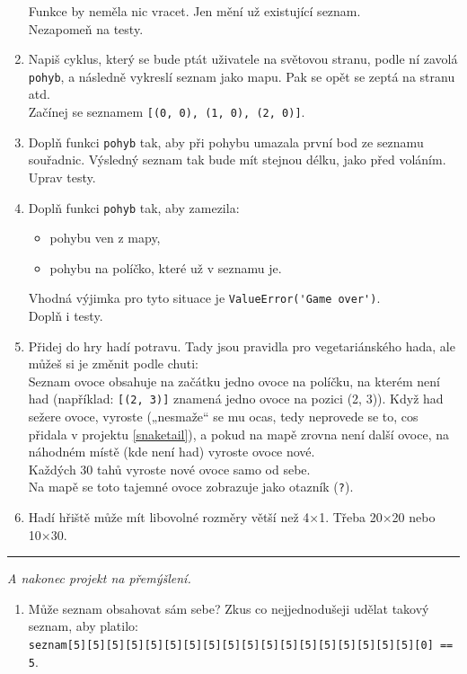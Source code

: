 \documentclass[a4paper,10pt]{article}
\newcommand\startsection[1]{
     \vspace{0.2ex}
    \hrule
    {\fontspec{Oxygen} \tiny
     \vspace{-1ex}
     \emph{#1}
     \vspace{-1.5em}
    }
}
\begin{document}
\begin{enumerate}[resume]
    Funkce by neměla nic vracet. Jen mění už existující seznam.
    \\Nezapomeň na testy.

\item Napiš cyklus, který se bude ptát uživatele na světovou stranu,
    podle ní zavolá \verb+pohyb+, a následně vykreslí seznam jako mapu.
    Pak se opět se zeptá na stranu atd.
    \\Začínej se seznamem \verb+[(0, 0), (1, 0), (2, 0)]+.

\item \label{snaketail}
    Doplň funkci \verb+pohyb+ tak, aby při pohybu umazala první bod ze seznamu
    souřadnic. Výsledný seznam tak bude mít stejnou délku, jako před voláním.
    \\Uprav testy.

\item Doplň funkci \verb+pohyb+ tak, aby zamezila:
    \begin{itemize}
    \item pohybu ven z mapy,
    \item pohybu na políčko, které už v seznamu je.
    \end{itemize}
    Vhodná výjimka pro tyto situace je \verb+ValueError('Game over')+.
    \\Doplň i testy.

\item Přidej do hry hadí potravu. Tady jsou pravidla pro vegetariánského hada,
    ale můžeš si je změnit podle chuti:
    \\ Seznam ovoce obsahuje na začátku jedno ovoce na políčku, na kterém není had
    (například: \texttt{[(2, 3)]} znamená jedno ovoce na pozici (2, 3)).
    Když had sežere ovoce, vyroste („nesmaže“ se mu ocas, tedy neprovede se to,
    cos přidala v projektu \ref{snaketail}),
    a pokud na mapě zrovna není další ovoce, na náhodném místě (kde není had) vyroste ovoce nové.
    \\Každých 30 tahů vyroste nové ovoce samo od sebe.
    \\Na mapě se toto tajemné ovoce zobrazuje jako otazník (\verb+?+).

\item \label{snakeend}
    Hadí hřiště může mít libovolné rozměry větší než 4×1.
    Třeba 20×20 nebo 10×30.

\end{enumerate}

\startsection{A nakonec projekt na přemýšlení.}

\begin{enumerate}[resume]

\item Může seznam obsahovat sám sebe? Zkus co nejjednodušeji udělat takový seznam, aby platilo:
    \\\verb+seznam[5][5][5][5][5][5][5][5][5][5][5][5][5][5][5][5][5][5][0] == 5+.

\end{enumerate}
\end{document}

